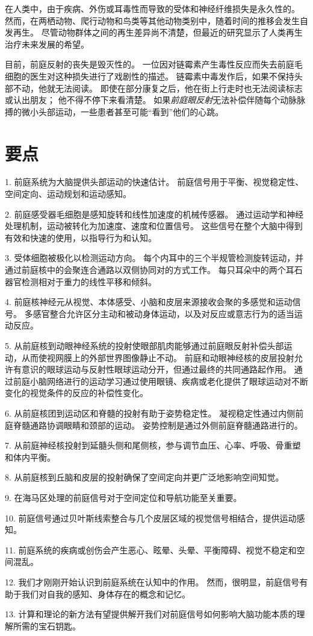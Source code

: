 在人类中，由于疾病、外伤或耳毒性而导致的受体和神经纤维损失是永久性的。
然而，在两栖动物、爬行动物和鸟类等其他动物类别中，随着时间的推移会发生自发再生。
尽管动物群体之间的再生差异尚不清楚，但最近的研究显示了人类再生治疗未来发展的希望。


目前，前庭反射的丧失是毁灭性的。
一位因对链霉素产生毒性反应而失去前庭毛细胞的医生对这种损失进行了戏剧性的描述。
链霉素中毒发作后，如果不保持头部不动，他就无法阅读。
即使在部分康复之后，他在街上行走时也无法阅读标志或认出朋友；
他不得不停下来看清楚。
如果\textit{前庭眼反射}无法补偿伴随每个动脉脉搏的微小头部运动，一些患者甚至可能“看到”他们的心跳。



\section{要点}

1. 前庭系统为大脑提供头部运动的快速估计。
前庭信号用于平衡、视觉稳定性、空间定向、运动规划和运动感知。


2. 前庭感受器毛细胞是感知旋转和线性加速度的机械传感器。
通过运动学和神经处理机制，运动被转化为加速度、速度和位置信号。
这些信号在整个大脑中得到有效和快速的使用，以指导行为和认知。


3. 受体细胞被极化以检测运动方向。
每个内耳中的三个半规管检测旋转运动，并通过前庭核中的会聚连合通路以双侧协同对的方式工作。
每只耳朵中的两个耳石器官检测相对于重力的线性平移和倾斜。


4. 前庭核神经元从视觉、本体感受、小脑和皮层来源接收会聚的多感觉和运动信号。
多感官整合允许区分主动和被动身体运动，以及对反应或意志行为的适当运动反应。


5. 从前庭核到动眼神经系统的投射使眼部肌肉能够通过前庭眼反射补偿头部运动，从而使视网膜上的外部世界图像静止不动。
前庭和动眼神经核的皮层投射允许有意识的眼球运动与反射性眼球运动分开，但通过最终的共同通路起作用。
通过前庭小脑网络进行的运动学习通过使用眼镜、疾病或老化提供了眼球运动对不断变化的视觉条件的反应的补偿性变化。


6. 从前庭核团到运动区和脊髓的投射有助于姿势稳定性。
凝视稳定性通过内侧前庭脊髓通路协调眼睛和颈部的运动。
姿势控制是通过外侧前庭脊髓通路进行的。


7. 从前庭神经核投射到延髓头侧和尾侧核，参与调节血压、心率、呼吸、骨重塑和体内平衡。


8. 从前庭核到丘脑和皮层的投射确保了空间定向并更广泛地影响空间知觉。


9. 在海马区处理的前庭信号对于空间定位和导航功能至关重要。


10. 前庭信号通过贝叶斯线索整合与几个皮层区域的视觉信号相结合，提供运动感知。


11. 前庭系统的疾病或创伤会产生恶心、眩晕、头晕、平衡障碍、视觉不稳定和空间混乱。


12. 我们才刚刚开始认识到前庭系统在认知中的作用。 然而，很明显，前庭信号有助于我们对自我的感知、身体存在的概念和记忆。


13. 计算和理论的新方法有望提供解开我们对前庭信号如何影响大脑功能本质的理解所需的宝石钥匙。




